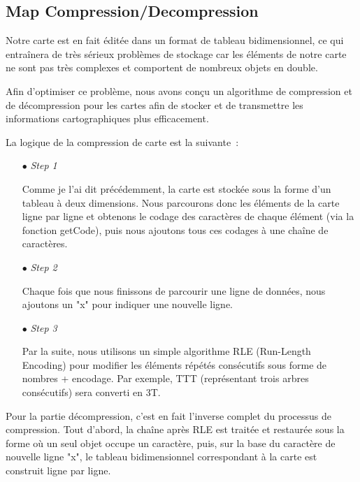 \documentclass[11pt,english]{article}
\begin{document}
\subsection{Map Compression/Decompression}

\indent

Notre carte est en fait éditée dans un format de tableau bidimensionnel, ce qui entraînera de très sérieux problèmes de stockage car les éléments de notre carte ne sont pas très complexes et comportent de nombreux objets en double.

\indent Afin d'optimiser ce problème, nous avons conçu un algorithme de compression et de décompression pour les cartes afin de stocker et de transmettre les informations cartographiques plus efficacement.

\indent La logique de la compression de carte est la suivante :

\small
{
\begin{itemize}
    \item [$\bullet$] \textit{Step 1}
    
    Comme je l'ai dit précédemment, la carte est stockée sous la forme d'un tableau à deux dimensions. Nous parcourons donc les éléments de la carte ligne par ligne et obtenons le codage des caractères de chaque élément (via la fonction getCode), puis nous ajoutons tous ces codages à une chaîne de caractères.

    \item [$\bullet$] \textit{Step 2}
    
    Chaque fois que nous finissons de parcourir une ligne de données, nous ajoutons un "x" pour indiquer une nouvelle ligne.

    \item [$\bullet$] \textit{Step 3}
    
    Par la suite, nous utilisons un simple algorithme RLE (Run-Length Encoding) pour modifier les éléments répétés consécutifs sous forme de nombres + encodage. Par exemple, TTT (représentant trois arbres consécutifs) sera converti en 3T.

\end{itemize}
}

\large

Pour la partie décompression, c’est en fait l’inverse complet du processus de compression. Tout d'abord, la chaîne après RLE est traitée et restaurée sous la forme où un seul objet occupe un caractère, puis, sur la base du caractère de nouvelle ligne "x", le tableau bidimensionnel correspondant à la carte est construit ligne par ligne.
\end{document}
